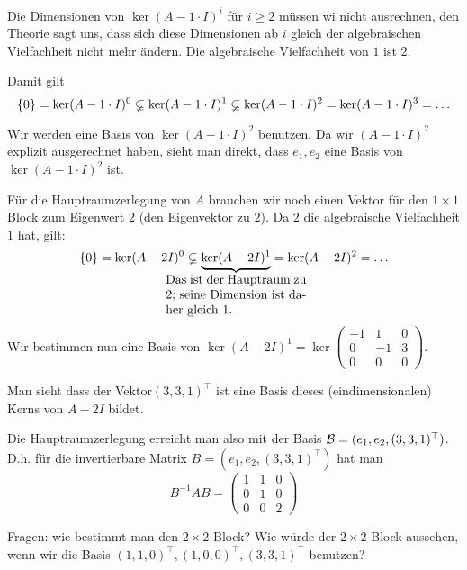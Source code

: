 \begin{bsp}
			Die Dimensionen von $\ker(A - 1\cdot I)^i$ für $i \ge 2$ müssen wi nicht ausrechnen, den Theorie sagt uns, dass sich diese Dimensionen ab $i$ gleich der algebraischen Vielfachheit nicht mehr ändern. Die algebraische Vielfachheit von $1$ ist $2$. 
						
			Damit gilt
			\begin{equation*}
				\left\{ 0 \right\} = \ker(A-1\cdot I)^0 \varsubsetneq \ker(A-1\cdot I)^1\varsubsetneq \ker(A-1\cdot I)^2 = \ker(A-1\cdot I)^3 = \ldots
			\end{equation*}
			
			Wir werden eine Basis von $ \ker(A - 1\cdot I)^2 $ benutzen. Da wir $(A - 1\cdot I)^2$ explizit ausgerechnet haben, sieht man direkt, dass  $ e_1,e_2 $ eine Basis von $ \ker(A - 1\cdot I)^2 $ ist. 
			
			Für die Hauptraumzerlegung von $A$ brauchen wir noch einen Vektor für den $1 \times 1$ Block zum Eigenwert $2$ (den Eigenvektor zu $2$). Da $2$ die algebraische Vielfachheit $1$ hat, gilt: 
			\begin{equation*}
				\set{0} = \ker(A - 2I)^0 \varsubsetneq \underbrace{\ker(A - 2I)^1}_{\mathclap{\begin{minipage}{0.325\textwidth}
					Das ist der Hauptraum zu 2; seine Dimension ist daher gleich 1.
				\end{minipage}}} = \ker(A - 2I)^2 = \ldots
			\end{equation*}
			Wir bestimmen nun eine Basis von $ \ker(A-2I)^1 = \ker\begin{pmatrix}
				-1 & 1 & 0 \\
				0 & -1 & 3 \\
				0 & 0 & 0
			\end{pmatrix} $. 
			
			Man sieht dass der Vektor$ (3,3,1)^\top $ ist eine Basis dieses (eindimensionalen) Kerns von $A - 2 I$ bildet. 
			
			Die Hauptraumzerlegung erreicht man also mit der Basis $ \mathcal{B} = (e_1,e_2,(3,3,1)^\top) $. D.h. für die invertierbare Matrix $ B = (e_1,e_2,(3,3,1)^\top) $ hat man
			\begin{equation*}
				B^{-1}AB = \left(\begin{array}{cc|c}
					1 & 1 & 0 \\
					0 & 1 & 0 \\ \hline
					0 & 0 & 2
				\end{array}\right)
			\end{equation*}
			
			Fragen: wie bestimmt man den $2 \times 2$ Block? Wie würde der $2 \times 2$ Block aussehen, wenn wir die Basis $ (1,1,0)^\top,(1,0,0)^\top,(3,3,1)^\top $ benutzen? 
\end{bsp}


